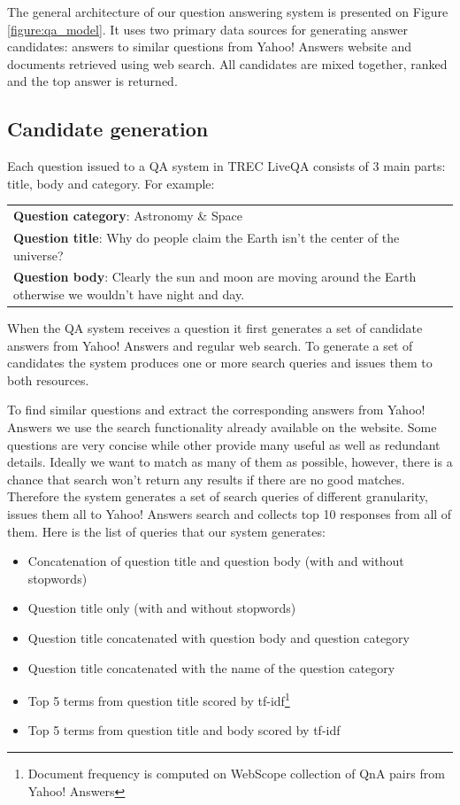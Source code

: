 \documentclass[]{article}
\begin{document}
The general architecture of our question answering system is presented on Figure \ref{figure:qa_model}.
It uses two primary data sources for generating answer candidates: answers to similar questions from Yahoo! Answers website and documents retrieved using web search. 
All candidates are mixed together, ranked and the top answer is returned.

\subsection{Candidate generation}
 
Each question issued to a QA system in TREC LiveQA consists of 3 main parts: title, body and category.
For example:

\vspace{0.3cm}
\begin{tabular}{|p{15cm}|}
\hline
\textbf{Question category}: Astronomy \& Space\\
\textbf{Question title}: Why do people claim the Earth isn't the center of the universe?\\
\textbf{Question body}: Clearly the sun and moon are moving around the Earth otherwise we wouldn't have night and day.\\
\hline
\end{tabular}
\vspace{0.3cm}

When the QA system receives a question it first generates a set of candidate answers from Yahoo! Answers and regular web search.
To generate a set of candidates the system produces one or more search queries and issues them to both resources.

To find similar questions and extract the corresponding answers from Yahoo! Answers we use the search functionality already available on the website.
Some questions are very concise while other provide many useful as well as redundant details.
Ideally we want to match as many of them as possible, however, there is a chance that search won't return any results if there are no good matches.
Therefore the system generates a set of search queries of different granularity, issues them all to Yahoo! Answers search and collects top 10 responses from all of them.
Here is the list of queries that our system generates:
\begin{itemize}
	\setlength\itemsep{0mm}
	\item Concatenation of question title and question body (with and without stopwords)
	\item Question title only (with and without stopwords)
	\item Question title concatenated with question body and question category
	\item Question title concatenated with the name of the question category
	\item Top 5 terms from question title scored by tf-idf\footnote{Document frequency is computed on WebScope collection of QnA pairs from Yahoo! Answers}
	\item Top 5 terms from question title and body scored by tf-idf
\end{itemize}
\end{document}
